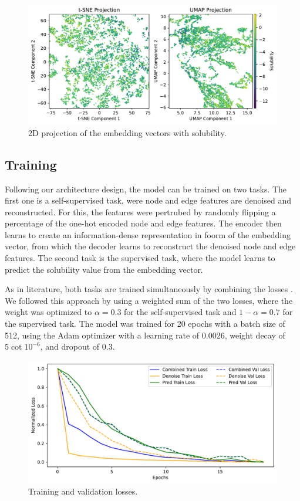 \documentclass[11pt,a4paper]{article}
\begin{document}
\begin{figure}[htbp]
        \centering
        \includegraphics[width=1\textwidth]{solubility.pdf}
        \caption{2D projection of the embedding vectors with solubility.}
        \label{fig:solubility}
\end{figure}

\subsection{Training}

Following our architecture design, the model can be trained on two tasks. The first one is a self-supervised task, were node and edge features are denoised and reconstructed. For this, the features were pertrubed by randomly flipping a percentage of the one-hot encoded node and edge features. The encoder then learns to create an information-dense representation in foorm of the embedding vector, from which the decoder learns to reconstruct the denoised node and edge features. The second task is the supervised task, where the model learns to predict the solubility value from the embedding vector.

As in literature, both tasks are trained simultaneously by combining the losses \cite{cui2025online, wang2022test}. We followed this approach by using a weighted sum of the two losses, where the weight was optimized to $\alpha = 0.3$ for the self-supervised task and $ 1 - \alpha = 0.7$ for the supervised task. The model was trained for 20 epochs with a batch size of 512, using the Adam optimizer with a learning rate of $0.0026$, weight decay of $5 \cot 10^{-6}$, and dropout of $0.3$.

\begin{figure}[htbp]
        \centering
        \includegraphics[width=1\textwidth]{loss_plot.pdf}
        \caption{Training and validation losses.}
        \label{fig:loss_plot}
\end{figure}
\end{document}
